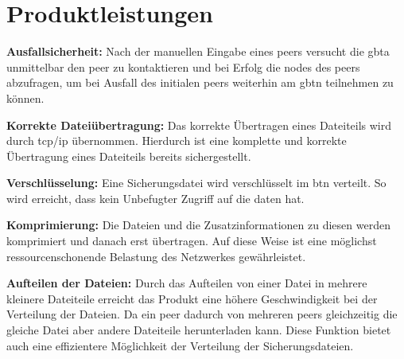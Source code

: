 \section{Produktleistungen} 

\begin{description}
  \item {\bfseries Ausfallsicherheit:} Nach der manuellen Eingabe eines \gls{peer}s versucht die \gls{gbta} unmittelbar den \gls{peer} zu kontaktieren und bei Erfolg die \gls{node}s des \gls{peer}s abzufragen, um bei Ausfall des initialen \gls{peer}s weiterhin am \gls{gbtn} teilnehmen zu können.
  \item {\bfseries Korrekte Dateiübertragung:} Das korrekte Übertragen 
eines Dateiteils wird durch \gls{tcp}/\gls{ip} übernommen. Hierdurch ist eine komplette und korrekte Übertragung eines Dateiteils bereits sichergestellt.
  \item {\bfseries Verschlüsselung:} Eine Sicherungsdatei wird verschlüsselt im \gls{btn} verteilt. So wird erreicht, dass kein Unbefugter Zugriff auf die \gls{daten} hat.
  \item {\bfseries Komprimierung:} Die Dateien und die Zusatzinformationen zu diesen werden komprimiert und danach erst übertragen. Auf diese Weise ist eine möglichst ressourcenschonende Belastung des Netzwerkes gewährleistet.
    \item {\bfseries Aufteilen der Dateien:} Durch das Aufteilen von einer Datei in mehrere kleinere Dateiteile erreicht das Produkt eine höhere Geschwindigkeit bei der Verteilung der Dateien. Da ein \gls{peer} dadurch von mehreren \gls{peer}s gleichzeitig die gleiche Datei aber andere Dateiteile herunterladen kann. Diese Funktion bietet auch eine effizientere Möglichkeit der Verteilung der Sicherungsdateien.
\end{description}
